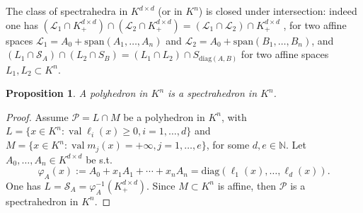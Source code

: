 \documentclass[sigconf]{acmart}
\newcommand{\PP}{\mathcal{P}}
\renewcommand{\span}[1]{{\mathrm{span}(#1)}} %
\newtheorem{proposition}[theorem]{Proposition}
\DeclareMathOperator{\val}{val}
\def\diag{\mathrm{diag}}
\begin{document}
The class of spectrahedra in $K^{d \times d}$ (or in $K^n$) is closed under intersection: indeed one
has $(\mathcal{L}_1 \cap K^{d \times d}_+) \cap (\mathcal{L}_2 \cap K^{d \times d}_+) =
(\mathcal{L}_1 \cap \mathcal{L}_2) \cap K^{d \times d}_+$
, for two affine spaces
$\mathcal{L}_1 = A_0+\span{A_1,\ldots,A_n}$ and $\mathcal{L}_2 = A_0+\span{B_1,\ldots,B_n}$,
and
$(L_1 \cap \mathcal{S}_A) \cap (L_2 \cap S_B) = (L_1\cap L_2) \cap S_{\diag(A,B)}$ for
two affine spaces $L_1,L_2 \subset K^n$.

\begin{proposition}
  A polyhedron in $K^n$ is a spectrahedron in $K^n$.
\end{proposition}
\begin{proof}
  Assume $\PP = L \cap M$ be a polyhedron in $K^n$, with
  $L = \{x \in K^n : \val \ell_i(x) \geq 0, i=1, \ldots, d\}$
  and $M = \{x \in K^n : \val m_j(x) = +\infty, j=1, \ldots, e\}$,
  for some $d, e \in \mathbb{N}$.
  Let $A_0,\ldots,A_n \in K^{d \times d}$ be s.t.
  $$
  \varphi_A(x) := A_0+x_1A_1+\cdots+x_nA_n = \diag(\ell_1(x), \ldots, \ell_d(x)).
  $$
  One has $L = \mathcal{S}_A = \varphi_A^{-1}(K^{d \times d}_+)$.
  Since $M \subset K^n$ is affine, then $\PP$ is a spectrahedron in $K^n$.
%
\end{proof}
\end{document}
